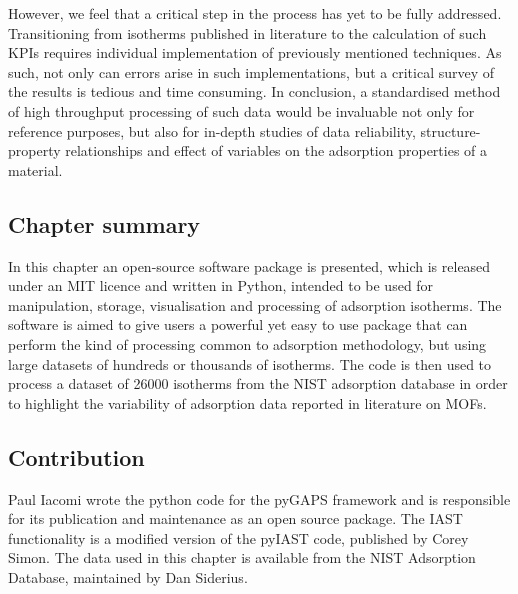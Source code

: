 However, we feel that a critical step in the process has yet
to be fully addressed. Transitioning from isotherms published in
literature to the calculation of such KPIs requires individual
implementation of previously mentioned techniques. As such,
not only can errors arise in such implementations, but
a critical survey of the results is tedious and time consuming.
In conclusion, a standardised method of high throughput processing
of such data would be invaluable not only for reference purposes,
but also for in-depth studies of data reliability,
structure-property relationships and effect of variables on
the adsorption properties of a material.

\subsection*{Chapter summary}

In this chapter an open-source software package is presented, which
is released under an MIT licence and written in Python, intended to be
used for manipulation, storage, visualisation and processing of
adsorption isotherms. The software is aimed to give users a powerful
yet easy to use package that can perform the kind of processing
common to adsorption methodology, but using large datasets of hundreds
or thousands of isotherms. The code is then used to process a
dataset of 26000 isotherms from the NIST adsorption database in order
to highlight the variability of adsorption data reported in literature
on MOFs.

\subsection*{Contribution}

Paul Iacomi wrote the python code for the pyGAPS framework and is
responsible for its publication and maintenance as an open source
package. The IAST functionality is a modified version of
the pyIAST code, published by Corey Simon. The data used in this chapter
is available from the NIST Adsorption Database, maintained by Dan Siderius.
